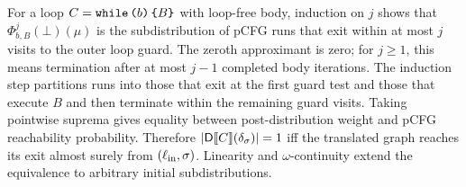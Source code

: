 For a loop $C=\textnormal{\texttt{while}}\,\textnormal{\texttt{(}} b\textnormal{\texttt{)}}\,\textnormal{\texttt{\{}} B\textnormal{\texttt{\}}}$ with loop-free body, induction on $j$ shows that $\Phi_{b,B}^{j}(\bot)(\mu)$ is the subdistribution of pCFG runs that exit within at most $j$ visits to the outer loop guard. The zeroth approximant is zero; for $j\geq1$, this means termination after at most $j-1$ completed body iterations. The induction step partitions runs into those that exit at the first guard test and those that execute $B$ and then terminate within the remaining guard visits. Taking pointwise suprema gives equality between post-distribution weight and pCFG reachability probability. Therefore $|\mathsf{D}\llbracket C\rrbracket(\delta_{\sigma})|=1$ iff the translated graph reaches its exit almost surely from $(\ell_{\rm in},\sigma)$. Linearity and $\omega$-continuity extend the equivalence to arbitrary initial subdistributions.

